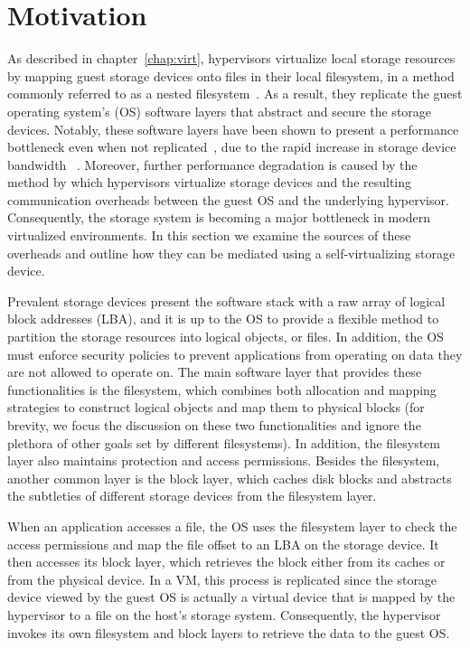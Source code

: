 
\chapter{Motivation}
\label{chap:motivation}


As described in chapter~\ref{chap:virt}, hypervisors virtualize local storage resources by mapping guest storage devices onto files in their local filesystem, in a method commonly referred to as a nested filesystem~\cite{le12nested}. As a result, they replicate the guest operating system's (OS) software layers that abstract and secure the storage devices. Notably, these software layers have been shown to present a performance bottleneck even when not replicated~\cite{yu14swoverheads}, due to the rapid increase in storage device bandwidth ~\cite{intel-ssd,seagate16ssd}.
%
Moreover, further performance degradation is caused by the method by which hypervisors virtualize storage devices and the resulting communication overheads between the guest OS and the underlying hypervisor.
Consequently, the storage system is becoming a major bottleneck in modern virtualized environments.
%
In this section we examine the sources of these overheads and outline how they can be mediated using a self-virtualizing storage device.

Prevalent storage devices present the software stack with a raw array of logical block addresses (LBA), and it is up to the OS to provide a flexible method to partition the storage resources into logical objects, or files. In addition, the OS must enforce security policies to prevent applications from operating on data they are not allowed to operate on.
%
The main software layer that provides these functionalities is the filesystem, which combines both allocation and mapping strategies to construct logical objects and map them to physical blocks (for brevity, we focus the discussion on these two functionalities and ignore the plethora of other goals set by different filesystems). In addition, the filesystem layer also maintains protection and access permissions. Besides the filesystem, another common layer is the block layer, which caches disk blocks and abstracts the subtleties of different storage devices from the filesystem layer.

When an application accesses a file, the OS uses the filesystem layer to check the access permissions and map the file offset to an LBA on the storage device. It then accesses its block layer, which retrieves the block either from its caches or from the physical device. In a VM, this process is replicated since the storage device viewed by the guest OS is actually a virtual device that is mapped by the hypervisor to a file on the host's storage system. Consequently, the hypervisor invokes its own filesystem and block layers to retrieve the data to the guest OS. 

